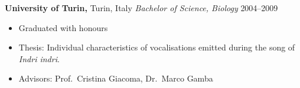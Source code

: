 
\vspace{5pt}

\textbf{University of Turin,} Turin, Italy \newline
\emph{Bachelor of Science, Biology}
\hfill{2004--2009}
\begin{itemize}
  \item Graduated with honours
  \item Thesis: Individual characteristics of vocalisations emitted during the song of \textit{Indri indri}.
  \item Advisors: Prof.~Cristina Giacoma, Dr.~Marco Gamba
\end{itemize}
